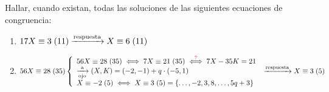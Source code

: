 \documentclass[12pt,a4paper, spanish]{article}
\begin{document}
\ejercicio
Hallar, cuando existan, todas las soluciones de las siguientes ecuaciones de congruencia:

\separadorCorto

\begin{enumerate}[label=\roman*)] 
  \item $\congruencia{17X}{3}{11} \flecha{respuesta} \congruencia{X}{6}{11} $\\

  \item $\congruencia{56X}{28}{35}\\
    \llave{l}{
      \congruencia{56X}{28}{35} \sisolosi
      \congruencia{7X}{21}{35} \stackrel{\red{?}}\sisolosi
      7X - 35K = 21\\
      \flecha{a}[ojo] (X,K) = (-2,-1) + q \cdot (-5, 1)\\
      \congruencia{X}{-2}{5} \sisolosi \congruencia{X}{3}{5} = \set{\dots, -2, 3, 8, \dots, 5q+3}
    }\\
    \flecha{respuesta} \congruencia{X}{3}{5} $
 \end{enumerate}

\separadorCorto
\end{document}
